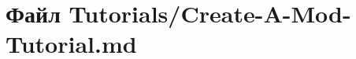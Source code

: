 \hypertarget{_create-_a-_mod-_tutorial_8md}{}\section{Файл Tutorials/\+Create-\/\+A-\/\+Mod-\/\+Tutorial.md}
\label{_create-_a-_mod-_tutorial_8md}
